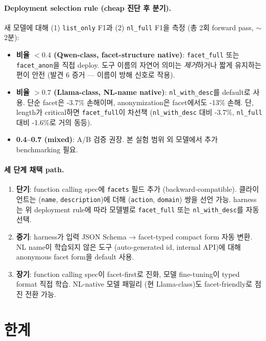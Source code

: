 \documentclass[11pt]{article}
\theoremstyle{plain}
\theoremstyle{definition}
\theoremstyle{remark}
\begin{document}
\paragraph{Deployment selection rule (cheap 진단 후 분기).}
새 모델에 대해 (1) \texttt{list\_only} F1과 (2) \texttt{nl\_full} F1을 측정 (총 2회 forward pass, $\sim$2분):
\begin{itemize}[leftmargin=*]
\item \textbf{비율 $< 0.4$ (Qwen-class, facet-structure native)}: \texttt{facet\_full} 또는 \texttt{facet\_anon}을 직접 deploy. 도구 이름의 자연어 의미는 \emph{제거}하거나 짧게 유지하는 편이 안전 (발견 6 증거 — 이름이 방해 신호로 작용).
\item \textbf{비율 $> 0.7$ (Llama-class, NL-name native)}: \texttt{nl\_with\_desc}를 default로 사용. 단순 facet은 -3.7\% 손해이며, anonymization은 facet에서도 -13\% 손해. 단, length가 critical하면 \texttt{facet\_full}이 차선책 (\texttt{nl\_with\_desc} 대비 -3.7\%, \texttt{nl\_full} 대비 -1.6\%로 거의 동등).
\item \textbf{0.4--0.7 (mixed)}: A/B 검증 권장. 본 실험 범위 외 모델에서 추가 benchmarking 필요.
\end{itemize}

\paragraph{세 단계 채택 path.}
\begin{enumerate}[leftmargin=*]
\item \textbf{단기}: function calling spec에 \texttt{facets} 필드 추가 (backward-compatible). 클라이언트는 (\texttt{name}, \texttt{description})에 더해 (\texttt{action}, \texttt{domain}) 쌍을 선언 가능. harness는 위 deployment rule에 따라 모델별로 \texttt{facet\_full} 또는 \texttt{nl\_with\_desc}를 자동 선택.
\item \textbf{중기}: harness가 입력 JSON Schema → facet-typed compact form 자동 변환. NL name이 학습되지 않은 도구 (auto-generated id, internal API)에 대해 anonymous facet form을 default 사용.
\item \textbf{장기}: function calling spec이 facet-first로 진화, 모델 fine-tuning이 typed format 직접 학습. NL-native 모델 패밀리 (현 Llama-class)도 facet-friendly로 점진 전환 가능.
\end{enumerate}

\section{한계}
\label{sec:limits}
\end{document}
